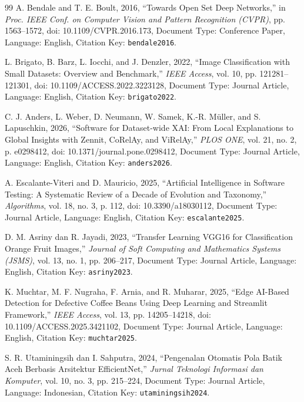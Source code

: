 \documentclass[10pt,a4paper]{article}
\begin{document}
\begin{thebibliography}{99}
A. Bendale and T. E. Boult, 2016, ``Towards Open Set Deep Networks,'' in \textit{Proc. IEEE Conf. on Computer Vision and Pattern Recognition (CVPR)}, pp. 1563--1572, doi: 10.1109/CVPR.2016.173, Document Type: Conference Paper, Language: English, Citation Key: \texttt{bendale2016}.

L. Brigato, B. Barz, L. Iocchi, and J. Denzler, 2022, ``Image Classification with Small Datasets: Overview and Benchmark,'' \textit{IEEE Access}, vol. 10, pp. 121281--121301, doi: 10.1109/ACCESS.2022.3223128, Document Type: Journal Article, Language: English, Citation Key: \texttt{brigato2022}.

C. J. Anders, L. Weber, D. Neumann, W. Samek, K.-R. Müller, and S. Lapuschkin, 2026, ``Software for Dataset-wide XAI: From Local Explanations to Global Insights with Zennit, CoRelAy, and ViRelAy,'' \textit{PLOS ONE}, vol. 21, no. 2, p. e0298412, doi: 10.1371/journal.pone.0298412, Document Type: Journal Article, Language: English, Citation Key: \texttt{anders2026}.

A. Escalante-Viteri and D. Mauricio, 2025, ``Artificial Intelligence in Software Testing: A Systematic Review of a Decade of Evolution and Taxonomy,'' \textit{Algorithms}, vol. 18, no. 3, p. 112, doi: 10.3390/a18030112, Document Type: Journal Article, Language: English, Citation Key: \texttt{escalante2025}.

D. M. Asriny dan R. Jayadi, 2023, ``Transfer Learning VGG16 for Classification Orange Fruit Images,'' \textit{Journal of Soft Computing and Mathematics Systems (JSMS)}, vol. 13, no. 1, pp. 206--217, Document Type: Journal Article, Language: English, Citation Key: \texttt{asriny2023}.

K. Muchtar, M. F. Nugraha, F. Arnia, and R. Muharar, 2025, ``Edge AI-Based Detection for Defective Coffee Beans Using Deep Learning and Streamlit Framework,'' \textit{IEEE Access}, vol. 13, pp. 14205--14218, doi: 10.1109/ACCESS.2025.3421102, Document Type: Journal Article, Language: English, Citation Key: \texttt{muchtar2025}.

S. R. Utaminingsih dan I. Sahputra, 2024, ``Pengenalan Otomatis Pola Batik Aceh Berbasis Arsitektur EfficientNet,'' \textit{Jurnal Teknologi Informasi dan Komputer}, vol. 10, no. 3, pp. 215--224, Document Type: Journal Article, Language: Indonesian, Citation Key: \texttt{utaminingsih2024}.


\end{thebibliography}
\end{document}
